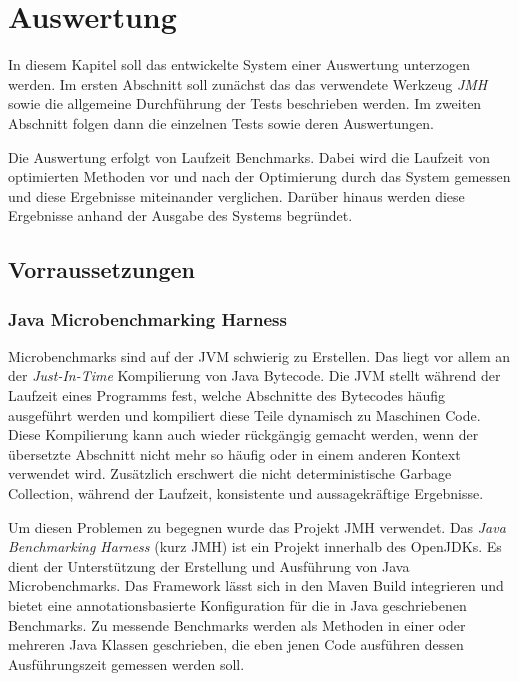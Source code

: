 \chapter{Auswertung}

In diesem Kapitel soll das entwickelte System einer Auswertung unterzogen werden.
Im ersten Abschnitt soll zunächst das das verwendete Werkzeug \textit{JMH} sowie 
die allgemeine Durchführung der Tests beschrieben werden. Im zweiten Abschnitt 
folgen dann die einzelnen Tests sowie deren Auswertungen.

Die Auswertung erfolgt von Laufzeit Benchmarks. Dabei wird die Laufzeit von 
optimierten Methoden vor und nach der Optimierung durch das System gemessen und 
diese Ergebnisse miteinander verglichen. Darüber hinaus werden diese Ergebnisse 
anhand der Ausgabe des Systems begründet.

\section{Vorraussetzungen}

\subsection{Java Microbenchmarking Harness}

Microbenchmarks sind auf der JVM schwierig zu Erstellen. Das liegt vor allem 
an der \textit{Just-In-Time} Kompilierung von Java Bytecode. Die JVM stellt 
während der Laufzeit eines Programms fest, welche Abschnitte des Bytecodes 
häufig ausgeführt werden und kompiliert diese Teile dynamisch zu Maschinen Code.
Diese Kompilierung kann auch wieder rückgängig gemacht werden, wenn der übersetzte
Abschnitt nicht mehr so häufig oder in einem anderen Kontext verwendet wird. Zusätzlich 
erschwert die nicht deterministische Garbage Collection, während der 
Laufzeit, konsistente und aussagekräftige Ergebnisse.

Um diesen Problemen zu begegnen wurde das Projekt JMH verwendet. Das \textit{Java Benchmarking Harness} 
(kurz JMH) ist ein Projekt innerhalb des OpenJDKs. Es dient der Unterstützung der 
Erstellung und Ausführung von Java Microbenchmarks. Das Framework lässt sich in 
den Maven Build integrieren und bietet eine annotationsbasierte Konfiguration 
für die in Java geschriebenen Benchmarks. Zu messende Benchmarks werden als Methoden 
in einer oder mehreren Java Klassen geschrieben, die eben jenen Code ausführen dessen Ausführungszeit 
gemessen werden soll. 

